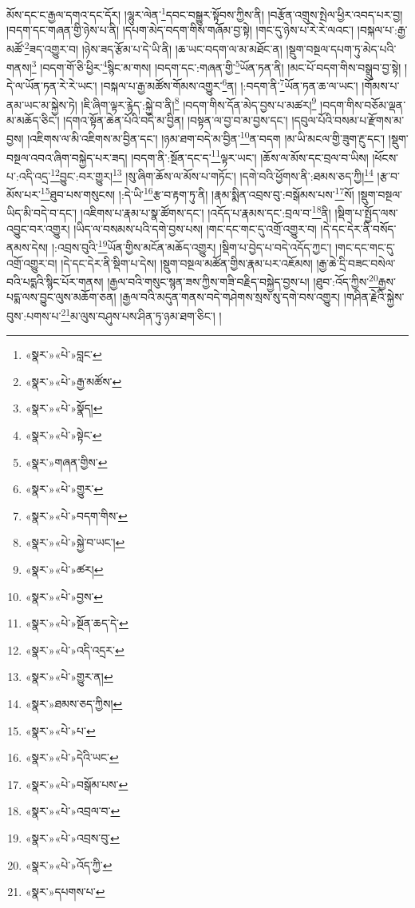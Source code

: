 མོས་དང་ང་རྒྱལ་དགའ་དང་དོར། །ལྷུར་ལེན་\footnote{«སྣར་»«པེ་»བླང་}དབང་བསྒྱུར་སྟོབས་ཀྱིས་ནི། །བརྩོན་འགྲུས་སྤེལ་ཕྱིར་འབད་པར་བྱ། །བདག་དང་གཞན་གྱི་ཉེས་པ་ནི། །དཔག་མེད་བདག་གིས་གཞོམ་བྱ་སྟེ། །གང་དུ་ཉེས་པ་རེ་རེ་ལའང་། །བསྐལ་པ་:རྒྱ་མཚོ་\footnote{«སྣར་»«པེ་»རྒྱ་མཚོས་}ཟད་འགྱུར་བ། །ཉེས་ཟད་རྩོམ་པ་དེ་ཡི་ནི། །ཆ་ཡང་བདག་ལ་མ་མཐོང་ན། །སྡུག་བསྔལ་དཔག་ཏུ་མེད་པའི་གནས།\footnote{«སྣར་»«པེ་»སྣོད།} །བདག་གོ་ཅི་ཕྱིར་\footnote{«སྣར་»«པེ་»སྟེང་}སྙིང་མ་གས། །བདག་དང་:གཞན་གྱི་\footnote{«སྣར་»གཞན་གྱིས་}ཡོན་ཏན་ནི། །མང་པོ་བདག་གིས་བསྒྲུབ་བྱ་སྟེ། །དེ་ལ་ཡོན་ཏན་རེ་རེ་ཡང་། །བསྐལ་པ་རྒྱ་མཚོས་གོམས་འགྱུར་\footnote{«སྣར་»«པེ་»གྱུར་}ན། །:བདག་ནི་\footnote{«སྣར་»«པེ་»བདག་གིས་}ཡོན་ཏན་ཆ་ལ་ཡང་། །གོམས་པ་ནམ་ཡང་མ་སྐྱེས་ཏེ། །ཇི་ཞིག་ལྟར་རྙེད་:སྐྱེ་བ་ནི།\footnote{«སྣར་»«པེ་»སྐྱེ་བ་ཡང་།} །བདག་གིས་དོན་མེད་བྱས་པ་མཚར།\footnote{«སྣར་»«པེ་»ཚར།} །བདག་གིས་བཅོམ་ལྡན་མ་མཆོད་ཅིང་། །དགའ་སྟོན་ཆེན་པོའི་བདེ་མ་བྱིན། །བསྟན་ལ་བྱ་བ་མ་བྱས་དང་། །དབུལ་པོའི་བསམ་པ་རྫོགས་མ་བྱས། །འཇིགས་ལ་མི་འཇིགས་མ་བྱིན་དང་། །ཉམ་ཐག་བདེ་མ་བྱིན་\footnote{«སྣར་»«པེ་»བྱས་}ན་བདག །མ་ཡི་མངལ་གྱི་ཟུག་རྔུ་དང་། །སྡུག་བསྔལ་འབའ་ཞིག་བསྐྱེད་པར་ཟད། །བདག་ནི་:སྔོན་དང་ད་\footnote{«སྣར་»«པེ་»སྔོན་ཆད་དེ་}ལྟར་ཡང་། །ཆོས་ལ་མོས་དང་བྲལ་བ་ཡིས། །ཕོངས་པ་:འདི་འདྲ་\footnote{«སྣར་»«པེ་»འདི་འདྲར་}བྱུང་:བར་གྱུར།\footnote{«སྣར་»«པེ་»གྱུར་ན།} །སུ་ཞིག་ཆོས་ལ་མོས་པ་གཏོང་། །དགེ་བའི་ཕྱོགས་ནི་:ཐམས་ཅད་ཀྱི།\footnote{«སྣར་»ཐམས་ཅད་ཀྱིས།} །རྩ་བ་མོས་པར་\footnote{«སྣར་»«པེ་»པ་}ཐུབ་པས་གསུངས། །:དེ་ཡི་\footnote{«སྣར་»«པེ་»དེའི་ཡང་}རྩ་བ་རྟག་ཏུ་ནི། །རྣམ་སྨིན་འབྲས་བུ་:བསྒོམས་པས་\footnote{«སྣར་»«པེ་»བསྒོམ་པས་}སོ། །སྡུག་བསྔལ་ཡིད་མི་བདེ་བ་དང་། །འཇིགས་པ་རྣམ་པ་སྣ་ཚོགས་དང་། །འདོད་པ་རྣམས་དང་:བྲལ་བ་\footnote{«སྣར་»«པེ་»འབྲལ་བ་}ནི། །སྡིག་པ་སྤྱོད་ལས་འབྱུང་བར་འགྱུར། །ཡིད་ལ་བསམས་པའི་དགེ་བྱས་པས། །གང་དང་གང་དུ་འགྲོ་འགྱུར་བ། །དེ་དང་དེར་ནི་བསོད་ནམས་དེས། །:འབྲས་བུའི་\footnote{«སྣར་»«པེ་»འབྲས་བུ་}ཡོན་གྱིས་མངོན་མཆོད་འགྱུར། །སྡིག་པ་བྱེད་པ་བདེ་འདོད་ཀྱང་། །གང་དང་གང་དུ་འགྲོ་འགྱུར་བ། །དེ་དང་དེར་ནི་སྡིག་པ་དེས། །སྡུག་བསྔལ་མཚོན་གྱིས་རྣམ་པར་འཇོམས། །རྒྱ་ཆེ་དྲི་བཟང་བསེལ་བའི་པདྨའི་སྙིང་པོར་གནས། །རྒྱལ་བའི་གསུང་སྙན་ཟས་ཀྱིས་གཟི་བརྗིད་བསྐྱེད་བྱས་པ། །ཐུབ་:འོད་ཀྱིས་\footnote{«སྣར་»«པེ་»འོད་ཀྱི་}རྒྱས་པདྨ་ལས་བྱུང་ལུས་མཆོག་ཅན། །རྒྱལ་བའི་མདུན་གནས་བདེ་གཤེགས་སྲས་སུ་དགེ་བས་འགྱུར། །གཤིན་རྗེའི་སྐྱེས་བུས་:པགས་པ་\footnote{«སྣར་»དཔགས་པ་}མ་ལུས་བཤུས་པས་ཤིན་ཏུ་ཉམ་ཐག་ཅིང་། །
